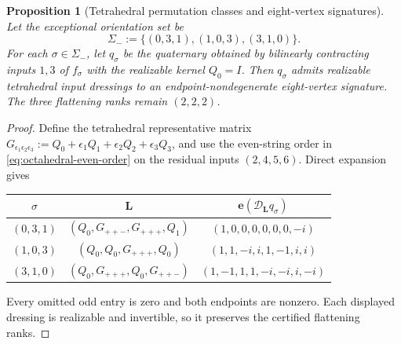 \documentclass[11pt,letterpaper,onecolumn]{article}
\theoremstyle{plain}
\newtheorem{proposition}[proposition]{Proposition}
\theoremstyle{definition}
\theoremstyle{remark}
\begin{document}
\begin{proposition}[Tetrahedral permutation classes and eight-vertex signatures]
\label{prop:p1-cert-A4-eight-vertex-orientation-terminal}
Let the exceptional orientation set be
\[
  \Sigma_-:=\{(0,3,1),(1,0,3),(3,1,0)\}.
\]
For each \(\sigma\in\Sigma_-\), let \(q_\sigma\) be the quaternary
obtained by bilinearly contracting inputs \(1,3\) of \(f_\sigma\) with the
realizable kernel \(Q_0=I\).  Then \(q_\sigma\)
admits realizable tetrahedral input dressings to an endpoint-nondegenerate eight-vertex signature.  The three
flattening ranks remain \((2,2,2)\).
\end{proposition}

\begin{proof}
Define the tetrahedral representative matrix
\(G_{\epsilon_1\epsilon_2\epsilon_3}
 :=Q_0+\epsilon_1Q_1+\epsilon_2Q_2+\epsilon_3Q_3\), and use the
even-string order in \cref{eq:octahedral-even-order} on the residual inputs
\((2,4,5,6)\).  Direct expansion gives
\begin{center}
\normalsize
\setlength{\tabcolsep}{5pt}
\begin{tabular}{ccc}
\toprule
\(\sigma\)&\(\mathbf L\)&\(\mathbf e(\mathscr D_{\mathbf L}q_\sigma)\)\\
\midrule
\((0,3,1)\)&\((Q_0,G_{++-},G_{+++},Q_1)\)&
\((1,0,0,0,0,0,0,-i)\)\\
\((1,0,3)\)&\((Q_0,Q_0,G_{+++},Q_0)\)&
\((1,1,-i,i,1,-1,i,i)\)\\
\((3,1,0)\)&\((Q_0,G_{+++},Q_0,G_{++-})\)&
\((1,-1,1,1,-i,-i,i,-i)\)\\
\bottomrule
\end{tabular}
\end{center}
Every omitted odd entry is zero and both endpoints are nonzero.  Each
displayed dressing is realizable and invertible, so it preserves the certified
flattening ranks.
\end{proof}
\end{document}
